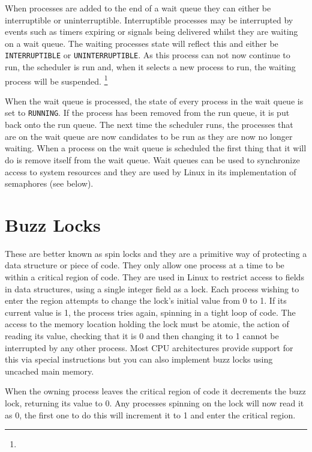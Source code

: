 When processes are added to the end of a wait queue they can either be interruptible or
uninterruptible.
Interruptible processes may be interrupted by events such as timers expiring or 
signals being delivered whilst they are waiting on a wait queue.
The waiting processes state will reflect this and either be \texttt{INTERRUPTIBLE} or 
\texttt{UNINTERRUPTIBLE}.
As this process can not now continue to run, the scheduler is run and, when it selects
a new process to run, the waiting process will be suspended.
\footnote{
}

When the wait queue is processed, the state of every process in the wait queue is set to
\texttt{RUNNING}.
If the process has been removed from the run queue, it is put back onto the run queue.
The next time the scheduler runs, the processes that are on the wait queue are now candidates
to be run as they are now no longer waiting.
When a process on the wait queue is scheduled the first thing that it will do is remove
itself from the wait queue.
Wait queues can be used to synchronize access to system resources and they are used by Linux in 
its implementation of semaphores (see below).

\section{Buzz Locks}
These are better known as spin locks and they are a primitive way of protecting a data structure
or piece of code.
They only allow one process at a time to be within a critical region of code.
They are used in Linux to restrict access to fields in data structures, using a single integer field
as a lock.
Each process wishing to enter the region attempts to change the lock's initial value from 0 to 1.
If its current value is 1, the process tries again, spinning in a tight loop of code.
The access to the memory location holding the lock must be atomic, the action of reading its value, checking
that it is 0 and then changing it to 1 cannot be interrupted by any other process.
Most CPU architectures provide support for this via special instructions but you can also implement buzz locks
using uncached main memory.

When the owning process leaves the critical region of code it decrements the buzz lock, returning its value to
0.
Any processes spinning on the lock will now read it as 0,
the first one to do this will increment it to 1 and enter the critical region.

